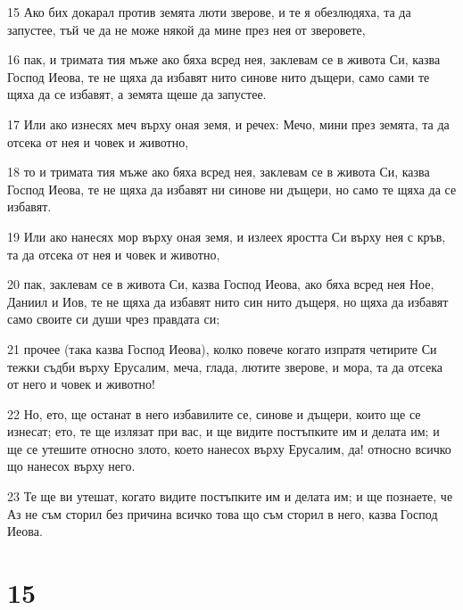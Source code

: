 \par 15 Ако бих докарал против земята люти зверове, и те я обезлюдяха, та да запустее, тъй че да не може някой да мине през нея от зверовете,
\par 16 пак, и тримата тия мъже ако бяха всред нея, заклевам се в живота Си, казва Господ Иеова, те не щяха да избавят нито синове нито дъщери, само сами те щяха да се избавят, а земята щеше да запустее.
\par 17 Или ако изнесях меч върху оная земя, и речех: Мечо, мини през земята, та да отсека от нея и човек и животно,
\par 18 то и тримата тия мъже ако бяха всред нея, заклевам се в живота Си, казва Господ Иеова, те не щяха да избавят ни синове ни дъщери, но само те щяха да се избавят.
\par 19 Или ако нанесях мор върху оная земя, и излеех яростта Си върху нея с кръв, та да отсека от нея и човек и животно,
\par 20 пак, заклевам се в живота Си, казва Господ Иеова, ако бяха всред нея Ное, Даниил и Иов, те не щяха да избавят нито син нито дъщеря, но щяха да избавят само своите си души чрез правдата си;
\par 21 прочее (така казва Господ Иеова), колко повече когато изпратя четирите Си тежки съдби върху Ерусалим, меча, глада, лютите зверове, и мора, та да отсека от него и човек и животно!
\par 22 Но, ето, ще останат в него избавилите се, синове и дъщери, които ще се изнесат; ето, те ще излязат при вас, и ще видите постъпките им и делата им; и ще се утешите относно злото, което нанесох върху Ерусалим, да! относно всичко що нанесох върху него.
\par 23 Те ще ви утешат, когато видите постъпките им и делата им; и ще познаете, че Аз не съм сторил без причина всичко това що съм сторил в него, казва Господ Иеова.

\chapter{15}

